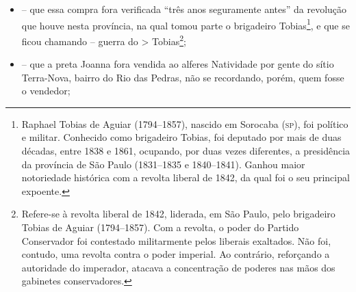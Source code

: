 {\begin{itemize}
\item
  -- que essa compra fora verificada ``três anos seguramente antes'' da
  revolução que houve nesta província, na qual tomou parte o brigadeiro
  Tobias\footnote{ Raphael Tobias de Aguiar (1794--1857), nascido em
    Sorocaba (\textsc{sp}), foi político e militar. Conhecido como brigadeiro
    Tobias, foi deputado por mais de duas décadas, entre 1838 e 1861,
    ocupando, por duas vezes diferentes, a presidência da província de
    São Paulo (1831--1835 e 1840--1841). Ganhou maior notoriedade
    histórica com a revolta liberal de 1842, da qual foi o seu principal
    expoente.}, e que se ficou chamando -- guerra do \textgreater{}
  Tobias\footnote{ Refere-se à revolta liberal de 1842, liderada, em
    São Paulo, pelo brigadeiro Tobias de Aguiar (1794--1857). Com a
    revolta, o poder do Partido Conservador foi contestado militarmente
    pelos liberais exaltados. Não foi, contudo, uma revolta contra o
    poder imperial. Ao contrário, reforçando a autoridade do imperador,
    atacava a concentração de poderes nas mãos dos gabinetes
    conservadores.};
\item
  -- que a preta Joanna fora vendida ao alferes Natividade por gente do
  sítio Terra-Nova, bairro do Rio das Pedras, não se recordando, porém,
  quem fosse o vendedor;
\end{itemize}

}
